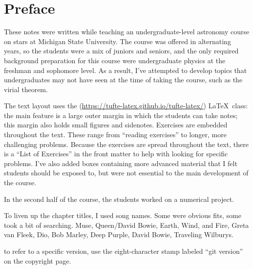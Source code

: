 
\section*{Preface}
These notes were written while teaching an undergraduate-level astronomy course on stars at Michigan State University. The course was offered in alternating years, so the students were a mix of juniors and seniors, and the only required background preparation for this course were undergraduate physics at the freshman and sophomore level. As a result, I've attempted to develop topics that undergraduates may not have seen at the time of taking the course, such as the virial theorem.

The text layout uses the  (\url{https://tufte-latex.github.io/tufte-latex/}) \LaTeX\ class:  the main feature is a large outer margin in which the students can take notes; this margin also holds small figures and sidenotes. Exercises are embedded throughout the text.  These range from ``reading exercises'' to longer, more challenging problems.  Because the exercises are spread throughout the text, there is a ``List of Exercises'' in the front matter to help with looking for specific problems. I've also added boxes containing more advanced material that I felt students should be exposed to, but were not essential to the main development of the course.

In the second half of the course, the students worked on a numerical project.

To liven up the chapter titles, I used song names. Some were obvious fits, some took a bit of searching. Muse, Queen/David Bowie, Earth, Wind, and Fire, Greta van Fleek, Dio, Bob Marley, Deep Purple, David Bowie, Traveling Wilburys.

 to refer to a specific version, use the eight-character stamp labeled ``git version'' on the copyright page.
